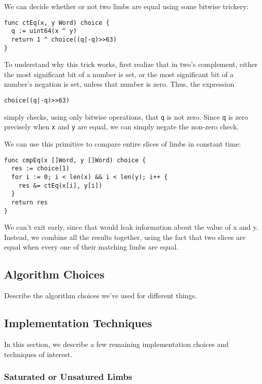 \documentclass[11pt, a4paper]{article} %
\begin{document}
{We can decide whether or not two limbs are equal using some bitwise
trickery:

\begin{verbatim}
func ctEq(x, y Word) choice {
  q := uint64(x ^ y)
  return 1 ^ choice((q|-q)>>63)
}
\end{verbatim}

To understand why this trick works, first realize that in two's complement,
either the most significant bit of a number is set, or the most significant
bit of a number's negation is set, unless that number is zero.
Thus, the expression
\begin{verbatim}
choice((q|-q)>>63)
\end{verbatim}
simply checks, using only bitwise operations, that
\texttt{q} is not zero.
Since \texttt{q} is zero precisely when \texttt{x} and \texttt{y}
are equal, we can simply negate the non-zero check.

We can use this primitive to compare entire slices of limbs
in constant time:

\begin{verbatim}
func cmpEq(x []Word, y []Word) choice {
  res := choice(1)
  for i := 0; i < len(x) && i < len(y); i++ {
    res &= ctEq(x[i], y[i])
  }
  return res
}
\end{verbatim}

We can't exit early, since that would leak information about
the value of x and y. Instead, we combine all the results together,
using the fact that two slices are equal when every one of their
matching limbs are equal.

\subsection{Algorithm Choices}

Describe the algorithm choices we've used for different things.

\subsection{Implementation Techniques}

In this section, we describe a few remaining implementation choices
and techniques of interest.

\subsubsection{Saturated or Unsatured Limbs}

}
\end{document}

